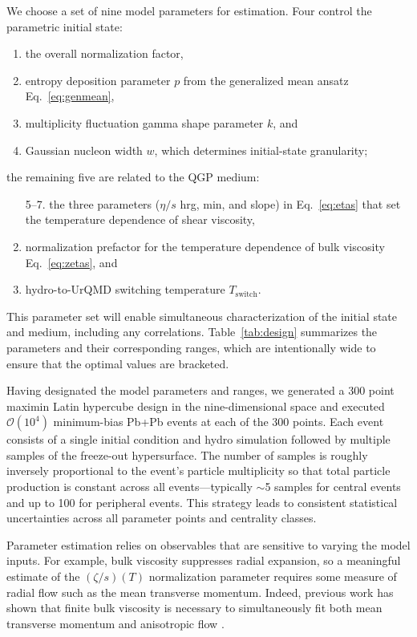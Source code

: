 \documentclass[aps,prc,reprint,amsmath,nofootinbib,superscriptaddress]{revtex4-1}
\newcommand{\order}[1]{$\mathcal O(10^{#1})$}
\begin{document}
We choose a set of nine model parameters for estimation.
Four control the parametric initial state:
\begin{enumerate}
  \item the overall normalization factor,
  \item entropy deposition parameter $p$ from the generalized mean ansatz Eq.~\eqref{eq:genmean},
  \item multiplicity fluctuation gamma shape parameter $k$, and
  \item Gaussian nucleon width $w$, which determines initial-state granularity;
\end{enumerate}
the remaining five are related to the QGP medium:
\begin{enumerate}
  \item[5--7.] the three parameters ($\eta/s$ hrg, min, and slope) in Eq.~\eqref{eq:etas} that set the temperature dependence of shear viscosity,
  \setcounter{enumi}{7}
  \item normalization prefactor for the temperature dependence of bulk viscosity Eq.~\eqref{eq:zetas}, and
  \item hydro-to-UrQMD switching temperature $T_\text{switch}$.
\end{enumerate}
This parameter set will enable simultaneous characterization of the initial state and medium, including any correlations.
Table~\ref{tab:design} summarizes the parameters and their corresponding ranges, which are intentionally wide to ensure that the optimal values are bracketed.

Having designated the model parameters and ranges, we generated a 300 point maximin Latin hypercube design \cite{Morris:1995lh} in the nine-dimensional space and executed \order 4 minimum-bias Pb+Pb events at each of the 300 points.
Each event consists of a single initial condition and hydro simulation followed by multiple samples of the freeze-out hypersurface.
The number of samples is roughly inversely proportional to the event's particle multiplicity so that total particle production is constant across all events---typically ${\sim}$5 samples for central events and up to 100 for peripheral events.
This strategy leads to consistent statistical uncertainties across all parameter points and centrality classes.

Parameter estimation relies on observables that are sensitive to varying the model inputs.
For example, bulk viscosity suppresses radial expansion, so a meaningful estimate of the $(\zeta/s)(T)$ normalization parameter requires some measure of radial flow such as the mean transverse momentum.
Indeed, previous work has shown that finite bulk viscosity is necessary to simultaneously fit both mean transverse momentum and anisotropic flow \cite{Ryu:2015vwa}.
\end{document}
